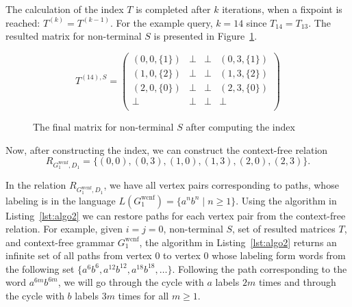 The calculation of the index $T$ is completed after $k$ iterations, when a fixpoint is reached: $T^{(k)} = T^{(k-1)}$. For the example query, $k = 14$ since $T_{14} = T_{13}$. The resulted matrix for non-terminal $S$ is presented in Figure~\ref{ExampleQueryFinalMatrices}.

{\footnotesize
	\begin{figure}[h]
		\[
		T^{(14),S} = \begin{pmatrix}
			(0,0,\{1\}) & \bot       & \bot & (0,3,\{1\})       \\
			(1,0,\{2\}) & \bot & \bot       & (1,3,\{2\}) \\
			(2,0,\{0\})       & \bot & \bot & (2,3,\{0\}) \\
			\bot       & \bot & \bot & \bot \\
		\end{pmatrix}
		\]
		\caption{The final matrix for non-terminal $S$ after computing the index}
		\label{ExampleQueryFinalMatrices}
	\end{figure}
}

Now, after constructing the index, we can construct the context-free relation $$R_{G_1^{\text{wcnf}}, D_1}=\{(0,0),(0,3),(1,0),(1,3),(2,0),(2,3)\}.$$

In the relation $R_{G_1^{\text{wcnf}}, D_1}$, we have all vertex pairs corresponding to paths, whose labeling is in the language $L(G_1^{\text{wcnf}}) = \{a^n b^n \mid n \geq 1\}$. Using the algorithm in Listing~\ref{lst:algo2} we can restore paths for each vertex pair from the context-free relation. For example, given $i=j=0$, non-terminal $S$, set of resulted matrices $T$, and context-free grammar $G_1^{\text{wcnf}}$, the algorithm in Listing~\ref{lst:algo2} returns an infinite set of all paths from vertex 0 to vertex 0 whose labeling form words from the following set $\{a^6 b^6, a^{12} b^{12}, a^{18} b^{18}, \ldots \}$. Following the path corresponding to the word $a^{6m} b^{6m}$, we will go through the cycle with $a$ labels $2m$ times and through the cycle with $b$ labels $3m$ times for all $m \geq 1$.